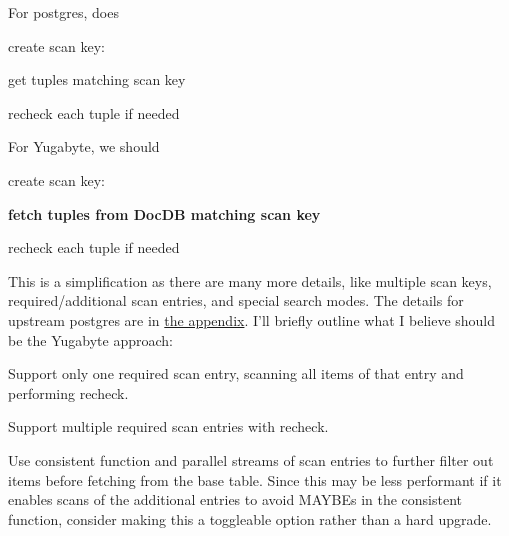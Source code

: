 For postgres,  does

\begin{nparts}
\item
  create scan key: 
\item
  get tuples matching scan key
\item
  recheck each tuple if needed
\end{nparts}

For Yugabyte, we should

\begin{nparts}
\item
  create scan key: 
\item
  \textbf{fetch tuples from DocDB matching scan key}
\item
  recheck each tuple if needed
\end{nparts}

This is a simplification as there are many more details, like multiple scan
keys, required/additional scan entries, and special search modes.  The details
for upstream postgres are in \protect\hyperlink{%
  read-path-extended}{%
  the appendix}.  I'll briefly outline what I believe should be the Yugabyte
approach:

\begin{nparts}
\item
  Support only one required scan entry, scanning all items of that entry and
  performing recheck.
\item
  Support multiple required scan entries with recheck.
\item
  Use consistent function and parallel streams of scan entries to further
  filter out items before fetching from the base table.  Since this may be less
  performant if it enables scans of the additional entries to avoid MAYBEs in
  the consistent function, consider making this a toggleable option rather than
  a hard upgrade.
\end{nparts}

